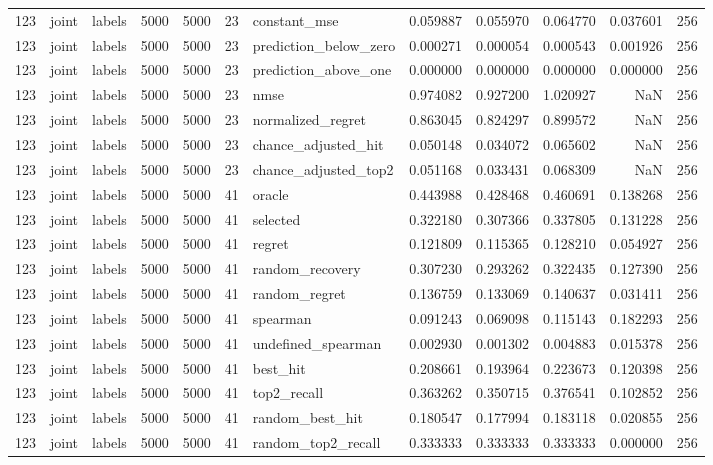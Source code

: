 \begin{tabular}{rllrrrlrrrrr}
123 & joint & labels & 5000 & 5000 & 23 & constant_mse & 0.059887 & 0.055970 & 0.064770 & 0.037601 & 256 \\
123 & joint & labels & 5000 & 5000 & 23 & prediction_below_zero & 0.000271 & 0.000054 & 0.000543 & 0.001926 & 256 \\
123 & joint & labels & 5000 & 5000 & 23 & prediction_above_one & 0.000000 & 0.000000 & 0.000000 & 0.000000 & 256 \\
123 & joint & labels & 5000 & 5000 & 23 & nmse & 0.974082 & 0.927200 & 1.020927 & NaN & 256 \\
123 & joint & labels & 5000 & 5000 & 23 & normalized_regret & 0.863045 & 0.824297 & 0.899572 & NaN & 256 \\
123 & joint & labels & 5000 & 5000 & 23 & chance_adjusted_hit & 0.050148 & 0.034072 & 0.065602 & NaN & 256 \\
123 & joint & labels & 5000 & 5000 & 23 & chance_adjusted_top2 & 0.051168 & 0.033431 & 0.068309 & NaN & 256 \\
123 & joint & labels & 5000 & 5000 & 41 & oracle & 0.443988 & 0.428468 & 0.460691 & 0.138268 & 256 \\
123 & joint & labels & 5000 & 5000 & 41 & selected & 0.322180 & 0.307366 & 0.337805 & 0.131228 & 256 \\
123 & joint & labels & 5000 & 5000 & 41 & regret & 0.121809 & 0.115365 & 0.128210 & 0.054927 & 256 \\
123 & joint & labels & 5000 & 5000 & 41 & random_recovery & 0.307230 & 0.293262 & 0.322435 & 0.127390 & 256 \\
123 & joint & labels & 5000 & 5000 & 41 & random_regret & 0.136759 & 0.133069 & 0.140637 & 0.031411 & 256 \\
123 & joint & labels & 5000 & 5000 & 41 & spearman & 0.091243 & 0.069098 & 0.115143 & 0.182293 & 256 \\
123 & joint & labels & 5000 & 5000 & 41 & undefined_spearman & 0.002930 & 0.001302 & 0.004883 & 0.015378 & 256 \\
123 & joint & labels & 5000 & 5000 & 41 & best_hit & 0.208661 & 0.193964 & 0.223673 & 0.120398 & 256 \\
123 & joint & labels & 5000 & 5000 & 41 & top2_recall & 0.363262 & 0.350715 & 0.376541 & 0.102852 & 256 \\
123 & joint & labels & 5000 & 5000 & 41 & random_best_hit & 0.180547 & 0.177994 & 0.183118 & 0.020855 & 256 \\
123 & joint & labels & 5000 & 5000 & 41 & random_top2_recall & 0.333333 & 0.333333 & 0.333333 & 0.000000 & 256 \\

\end{tabular}
